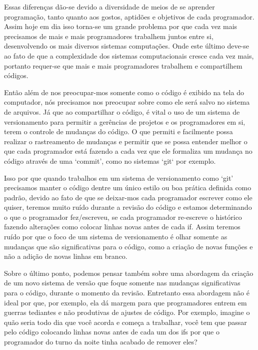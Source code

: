     Essas diferenças dão-se devido a diversidade de meios de se aprender programação, tanto quanto
    aos gostos, aptidões e objetivos de cada programador. Assim hoje em dia isso torna-se um grande
    problema por que cada vez mais precisamos de mais e mais programadores trabalhem juntos entre
    si, desenvolvendo os mais diversos sistemas computações. Onde este último deve-se ao fato de que
    a complexidade dos sistemas computacionais cresce cada vez mais, portanto requer-se que mais e
    mais programadores trabalhem e compartilhem códigos.

    Então além de nos preocupar-mos somente como o código é exibido na tela do computador, nós
    precisamos nos preocupar sobre como ele será salvo no sistema de arquivos. Já que ao
    compartilhar o código, é vital o uso de um sistema de versionamento para permitir a gerências de
    projetos e os programadores em si, terem o controle de mudanças do código. O que permiti e
    facilmente possa realizar o rastreamento de mudanças e permitir que se possa entender melhor o
    que cada programador está fazendo a cada vez que ele formaliza um mudança no código através de
    uma `commit', como no sistemas `git` por exemplo.

    Isso por que quando trabalhos em um sistema de versionamento como `git' precisamos manter o
    código dentre um único estilo ou boa prática definida como padrão, devido ao fato de que se
    deixar-mos cada programador escrever como ele quiser, teremos muito ruído durante a revisão do
    código e estamos determinando o que o programador fez/escreveu, se cada programador re-escreve o
    histórico fazendo alterações como colocar linhas novas antes de cada if. Assim teremos ruído por
    que o foco de um sistema de versionamento é olhar somente as mudanças que são significativas
    para o código, como a criação de novas funções e não a adição de novas linhas em branco.

    Sobre o último ponto, podemos pensar também sobre uma abordagem da criação de um novo sistema de
    versão que foque somente nas mudanças significativas para o código, durante o momento da
    revisão. Entretanto essa abordagem não é ideal por que, por exemplo, ela dá margem para que
    programadores entrem em guerras tediantes e não produtivas de ajustes de código. Por exemplo,
    imagine o quão seria todo dia que você acorda e começa a trabalhar, você tem que passar pelo
    código colocando linhas novas antes de cada um dos if\textquotesingle s por que o programador do
    turno da noite tinha acabado de remover eles?


